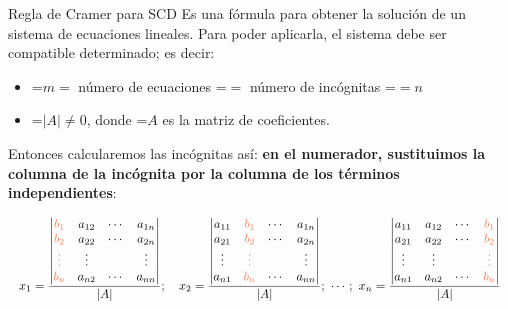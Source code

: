 \documentclass[11pt,a4paper]{article}
\newcommand{\fmm}[1]{\setbox0=\hbox{$#1$}\ifdim\wd0>\linewidth\fmdisp{#1}\else\mbox{\box0}\fi}
\newcommand{\fmdisp}[1]{\[\setbox2=\hbox{$\displaystyle #1$}\ifdim\wd2>\linewidth\resizebox{\linewidth}{!}{\box2}\else\box2\fi\]}
\begin{document}
\begin{fmdef}{Regla de Cramer para SCD}
Es una fórmula para obtener la solución de un sistema de ecuaciones lineales. Para poder aplicarla, el sistema debe ser compatible determinado; es decir:

\begin{itemize}
\item \fmm{m=} número de ecuaciones \fmm{=} número de incógnitas \fmm{=n}
\item \fmm{|A|\neq0}, donde \fmm{A} es la matriz de coeficientes.
\end{itemize}

Entonces calcularemos las incógnitas así: \textbf{en el numerador, sustituimos la columna de la incógnita por la columna de los términos independientes}:

\fmdisp{x_1=\frac{\begin{vmatrix}\color[HTML]{ff7a50}b_1 & a_{12} & \cdots & a_{1n}\\ \color[HTML]{ff7a50}b_2 & a_{22} & \cdots & a_{2n}\\ \color[HTML]{ff7a50}\vdots & \vdots & & \vdots\\ \color[HTML]{ff7a50}b_n & a_{n2} & \cdots & a_{nn}\end{vmatrix}}{|A|};\quad x_2=\frac{\begin{vmatrix}a_{11} & \color[HTML]{ff7a50}b_1 & \cdots & a_{1n}\\ a_{21} & \color[HTML]{ff7a50}b_2 & \cdots & a_{2n}\\ \vdots & \color[HTML]{ff7a50}\vdots & & \vdots\\ a_{n1} & \color[HTML]{ff7a50}b_n & \cdots & a_{nn}\end{vmatrix}}{|A|};\ \cdots;\ x_n=\frac{\begin{vmatrix}a_{11} & a_{12} & \cdots & \color[HTML]{ff7a50}b_1\\ a_{21} & a_{22} & \cdots & \color[HTML]{ff7a50}b_2\\ \vdots & \vdots & & \color[HTML]{ff7a50}\vdots\\ a_{n1} & a_{n2} & \cdots & \color[HTML]{ff7a50}b_n\end{vmatrix}}{|A|}}

\end{fmdef}
\end{document}
